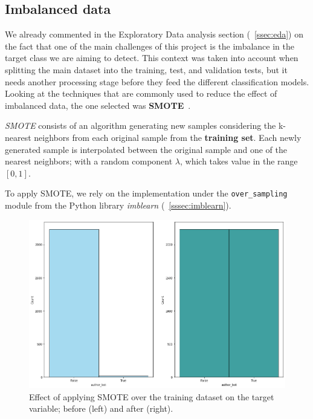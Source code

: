 \documentclass[a4paper, 12pt]{book}
\begin{document}
\subsection{Imbalanced data}
\label{ssec:imbalanced-data}


We already commented in the Exploratory Data analysis section (~\ref{ssec:eda}) on the fact that one of the main challenges of this project is the imbalance in the target class we are aiming to detect. This context was taken into account when splitting the main dataset into the training, test, and validation tests, but it needs another processing stage before they feed the different classification models. Looking at the techniques that are commonly used to reduce the effect of imbalanced data, the one selected was \textbf{SMOTE}~\cite{chawla2002smote}. 

\textit{SMOTE} consists of an algorithm generating new samples considering the k-nearest neighbors from each original sample from the \textbf{training set}. Each newly generated sample is interpolated between the original sample and one of the nearest neighbors; with a random component $\lambda$, which takes value in the range $[0, 1]$.

To apply SMOTE, we rely on the implementation under the \texttt{over\_sampling} module from the Python library \textit{imblearn} (~\ref{sssec:imblearn}).

\begin{figure}
 \centering
  \includegraphics[width=17cm, keepaspectratio]{img/author_bot_SMOTE_train.png}
  \caption{Effect of applying SMOTE over the training dataset on the target variable; before (left) and after (right).}
  \label{fig:smote-train}
\end{figure}
\end{document}
